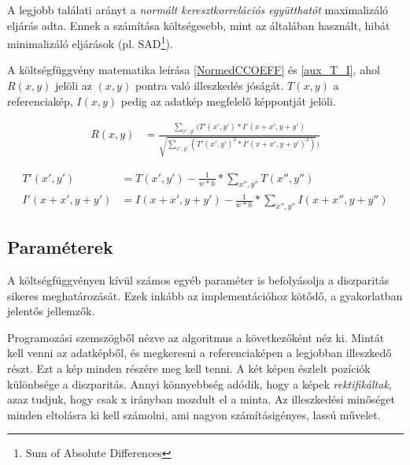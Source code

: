 A legjobb találati arányt a \emph{normált keresztkorrelációs együtthatót} maximalizáló eljárás adta.
Ennek a számítása költségesebb, mint az általában használt, hibát minimalizáló eljárások (pl. SAD\footnote{Sum of Absolute Differences}).

A költségfüggvény matematika leírása \eqref{NormedCCOEFF} és \eqref{aux_T_I}, ahol $R(x,y)$ jelöli az $(x,y)$ pontra való illeszkedés jóságát.
$T(x,y)$ a referenciakép, $I(x,y)$ pedig az adatkép megfelelő képpontját jelöli.

\begin{equation}\label{eq:NormedCCOEFF}
	\begin{split}
		R(x,y) & = \frac{\sum_{x', y'} (T'(x', y') * I'(x+x', y+y')}{\sqrt{\sum_{x', y'} (T'(x', y')^2 * I'(x+x', y+y')^2)})}
	\end{split}
\end{equation}

\begin{equation}\label{eq:aux_T_I}
	\begin{split}
		T'(x',y') & = T(x',y') - \frac{1}{w*h} * \sum_{x'', y''} T(x'',y'') \\
		I'(x+x',y+y') & = I(x+x',y+y') - \frac{1}{w*h} * \sum_{x'',y''} I(x+x'',y+y'')
	\end{split}
\end{equation}

\subsection{Paraméterek}\label{sect:params}

A költségfüggvényen kívül számos egyéb paraméter is befolyásolja a diszparitás sikeres meghatározását.
Ezek inkább az implementációhoz kötődő, a gyakorlatban jelentős jellemzők.

Programozási szemszögből nézve az algoritmus a következőként néz ki.
Mintát kell venni az adatképből, és megkeresni a referenciaképen a legjobban illeszkedő részt.
Ezt a kép minden részére meg kell tenni.
A két képen észlelt pozíciók különbsége a diszparitás.
Annyi könnyebbség adódik, hogy a képek \emph{rektifikáltak}, azaz tudjuk, hogy csak x irányban mozdult el a minta.
Az illeszkedési minőséget minden eltolásra ki kell számolni, ami nagyon számításigényes, lassú művelet.

